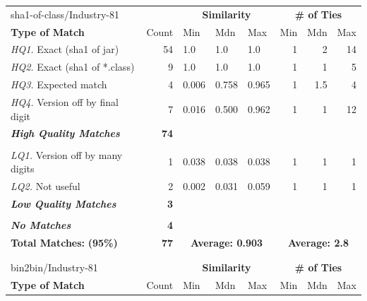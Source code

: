 \begin{table}[h]
  \centering
\begin{tabular}[htbp]{l|r|lll|rrr}
  sha1-of-class/Industry-81  &              & \multicolumn{3}{c|}{\textbf{Similarity}}  & \multicolumn{3}{c}{\textbf{\# of Ties}} \\
  \textbf{Type of Match}     & Count        & Min   & Mdn    & Max   & Min  & Mdn  & Max  \\
  \hline
  \emph{HQ1.} Exact (sha1 of jar)        & 54           & 1.0   & 1.0    & 1.0   & 1    & 2    & 14   \\
  \emph{HQ2.} Exact (sha1 of *.class)    &  9           & 1.0   & 1.0    & 1.0   & 1    & 1    &  5   \\
  \emph{HQ3.} Expected match             &  4           & 0.006 & 0.758  & 0.965 & 1    & 1.5  &  4   \\
  \emph{HQ4.} Version off by final digit &  7           & 0.016 & 0.500  & 0.962 & 1    & 1    & 12   \\
  \emph{\textbf{High Quality Matches}}   & \textbf{74}  &       &        &       &      &      &      \\
& & & & & & & \\
  \emph{LQ1.} Version off by many digits &  1           & 0.038 & 0.038  & 0.038 & 1    & 1    &  1   \\
  \emph{LQ2.} Not useful                 &  2           & 0.002 & 0.031  & 0.059 & 1    & 1    &  1   \\
  \emph{\textbf{Low Quality Matches}}    & \textbf{3}   &       &        &       &      &      &      \\
& & & & & & & \\
  \emph{\textbf{No Matches}}             & \textbf{4}   &       &        &       &      &      &      \\
  \hline
  \textbf{Total Matches:} \hspace{3em}   \textbf{(95\%)} &  \textbf{77}   & \multicolumn{3}{c|}{\textbf{Average: 0.903}}  & \multicolumn{3}{c}{\textbf{Average: 2.8}} \\
   \multicolumn{8}{c}{} \\
   \multicolumn{8}{c}{} \\
  bin2bin/Industry-81        &              & \multicolumn{3}{c|}{\textbf{Similarity}}  & \multicolumn{3}{c}{\textbf{\# of Ties}} \\
  \textbf{Type of Match}     & Count        & Min   & Mdn    & Max   & Min  & Mdn  & Max  \\

\end{tabular}
\end{table}
